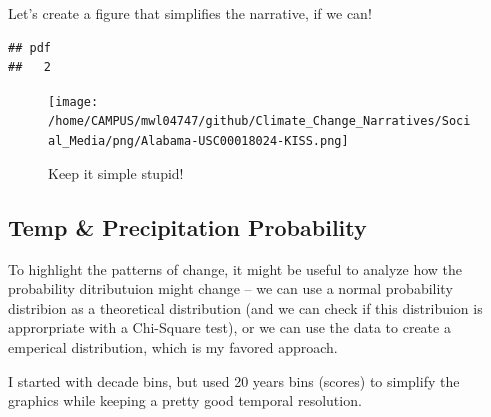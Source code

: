 \documentclass{article}\usepackage[]{graphicx}\usepackage[]{color}
\makeatletter
\newenvironment{kframe}{%
 \def\at@end@of@kframe{}%
 \ifinner\ifhmode%
  \def\at@end@of@kframe{\end{minipage}}%
  \begin{minipage}{\columnwidth}%
 \fi\fi%
 \def\FrameCommand##1{\hskip\@totalleftmargin \hskip-\fboxsep
 \colorbox{shadecolor}{##1}\hskip-\fboxsep
     \hskip-\linewidth \hskip-\@totalleftmargin \hskip\columnwidth}%
 \MakeFramed {\advance\hsize-\width
   \@totalleftmargin\z@ \linewidth\hsize
   \@setminipage}}%
 {\par\unskip\endMakeFramed%
 \at@end@of@kframe}
\newenvironment{knitrout}{}{} %
\makeatother
\begin{document}
Let's create a figure that simplifies the narrative, if we can!

\begin{knitrout}
\color{fgcolor}\begin{kframe}
\begin{verbatim}
## pdf 
##   2
\end{verbatim}
\end{kframe}
\end{knitrout}

\begin{figure}
\texttt{[image: /home/CAMPUS/mwl04747/github/Climate\_Change\_Narratives/Social\_Media/png/Alabama-USC00018024-KISS.png]}
\caption{Keep it simple stupid!}
\label{fig:GSOM-KISS}
\end{figure}



\subsection{Temp \& Precipitation Probability}

To highlight the patterns of change, it might be useful to analyze how the probability ditributuion might change -- we can use a normal probability distribion as a theoretical distribution (and we can check if this distribuion is approrpriate with a Chi-Square test), or we can use the data to create a emperical distribution, which is my favored approach. 

I started with decade bins, but used 20 years bins (scores) to simplify the graphics while keeping a pretty good temporal resolution.
\end{document}
